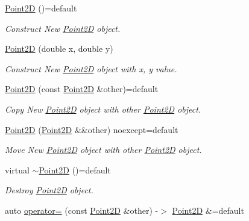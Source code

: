 \begin{DoxyCompactItemize}
\item 
\hyperlink{classprogrammers_1_1geometry_1_1Point2D_af4b2368f1cba27c5c1888a104c18c606}{Point2D} ()=default
\begin{DoxyCompactList}\small\item\em Construct New \hyperlink{classprogrammers_1_1geometry_1_1Point2D}{Point2D} object. \end{DoxyCompactList}\item 
\hyperlink{classprogrammers_1_1geometry_1_1Point2D_aec20eb5faef2545f78f6815d59d266e2}{Point2D} (double x, double y)
\begin{DoxyCompactList}\small\item\em Construct New \hyperlink{classprogrammers_1_1geometry_1_1Point2D}{Point2D} object with x, y value. \end{DoxyCompactList}\item 
\hyperlink{classprogrammers_1_1geometry_1_1Point2D_af02291ab4688ab64da885fa99615531e}{Point2D} (const \hyperlink{classprogrammers_1_1geometry_1_1Point2D}{Point2D} \&other)=default
\begin{DoxyCompactList}\small\item\em Copy New \hyperlink{classprogrammers_1_1geometry_1_1Point2D}{Point2D} object with other \hyperlink{classprogrammers_1_1geometry_1_1Point2D}{Point2D} object. \end{DoxyCompactList}\item 
\hyperlink{classprogrammers_1_1geometry_1_1Point2D_a1ca663bb5fa5f8b18525557dc44162a2}{Point2D} (\hyperlink{classprogrammers_1_1geometry_1_1Point2D}{Point2D} \&\&other) noexcept=default
\begin{DoxyCompactList}\small\item\em Move New \hyperlink{classprogrammers_1_1geometry_1_1Point2D}{Point2D} object with other \hyperlink{classprogrammers_1_1geometry_1_1Point2D}{Point2D} object. \end{DoxyCompactList}\item 
virtual \hyperlink{classprogrammers_1_1geometry_1_1Point2D_a61f13d98978ddb65c4380657fb429cb3}{$\sim$\+Point2D} ()=default
\begin{DoxyCompactList}\small\item\em Destroy \hyperlink{classprogrammers_1_1geometry_1_1Point2D}{Point2D} object. \end{DoxyCompactList}\item 
auto \hyperlink{classprogrammers_1_1geometry_1_1Point2D_a1ccae7f5bd4db986140bf7566f3939c5}{operator=} (const \hyperlink{classprogrammers_1_1geometry_1_1Point2D}{Point2D} \&other) -\/$>$ \hyperlink{classprogrammers_1_1geometry_1_1Point2D}{Point2D} \&=default

\end{DoxyCompactItemize}
